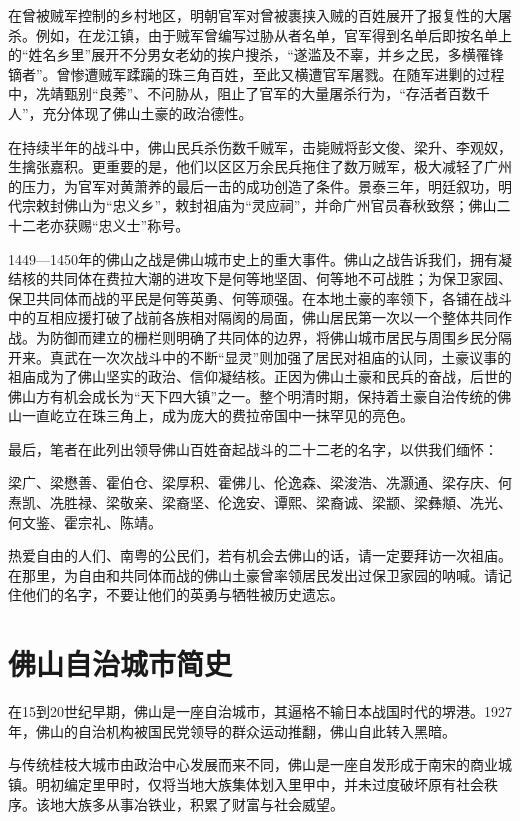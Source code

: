 在曾被贼军控制的乡村地区，明朝官军对曾被裹挟入贼的百姓展开了报复性的大屠杀。例如，在龙江镇，由于贼军曾编写过胁从者名单，官军得到名单后即按名单上的“姓名乡里”展开不分男女老幼的挨户搜杀，“遂滥及不辜，并乡之民，多横罹锋镝者”。曾惨遭贼军蹂躏的珠三角百姓，至此又横遭官军屠戮。在随军进剿的过程中，冼靖甄别“良莠”、不问胁从，阻止了官军的大量屠杀行为，“存活者百数千人”，充分体现了佛山土豪的政治德性。

在持续半年的战斗中，佛山民兵杀伤数千贼军，击毙贼将彭文俊、梁升、李观奴，生擒张嘉积。更重要的是，他们以区区万余民兵拖住了数万贼军，极大减轻了广州的压力，为官军对黄萧养的最后一击的成功创造了条件。景泰三年，明廷叙功，明代宗敕封佛山为“忠义乡”，敕封祖庙为“灵应祠”，并命广州官员春秋致祭；佛山二十二老亦获赐“忠义士”称号。

1449—1450年的佛山之战是佛山城市史上的重大事件。佛山之战告诉我们，拥有凝结核的共同体在费拉大潮的进攻下是何等地坚固、何等地不可战胜；为保卫家园、保卫共同体而战的平民是何等英勇、何等顽强。在本地土豪的率领下，各铺在战斗中的互相应援打破了战前各族相对隔阂的局面，佛山居民第一次以一个整体共同作战。为防御而建立的栅栏则明确了共同体的边界，将佛山城市居民与周围乡民分隔开来。真武在一次次战斗中的不断“显灵”则加强了居民对祖庙的认同，土豪议事的祖庙成为了佛山坚实的政治、信仰凝结核。正因为佛山土豪和民兵的奋战，后世的佛山方有机会成长为“天下四大镇”之一。整个明清时期，保持着土豪自治传统的佛山一直屹立在珠三角上，成为庞大的费拉帝国中一抹罕见的亮色。

最后，笔者在此列出领导佛山百姓奋起战斗的二十二老的名字，以供我们缅怀：

梁广、梁懋善、霍伯仓、梁厚积、霍佛儿、伦逸森、梁浚浩、冼灏通、梁存庆、何焘凯、冼胜禄、梁敬亲、梁裔坚、伦逸安、谭熙、梁裔诚、梁颛、梁彝頫、冼光、何文鉴、霍宗礼、陈靖。

热爱自由的人们、南粤的公民们，若有机会去佛山的话，请一定要拜访一次祖庙。在那里，为自由和共同体而战的佛山土豪曾率领居民发出过保卫家园的呐喊。请记住他们的名字，不要让他们的英勇与牺牲被历史遗忘。


\chapter{佛山自治城市简史}

在15到20世纪早期，佛山是一座自治城市，其逼格不输日本战国时代的堺港。1927年，佛山的自治机构被国民党领导的群众运动推翻，佛山自此转入黑暗。

与传统桂枝大城市由政治中心发展而来不同，佛山是一座自发形成于南宋的商业城镇。明初编定里甲时，仅将当地大族集体划入里甲中，并未过度破坏原有社会秩序。该地大族多从事冶铁业，积累了财富与社会威望。

